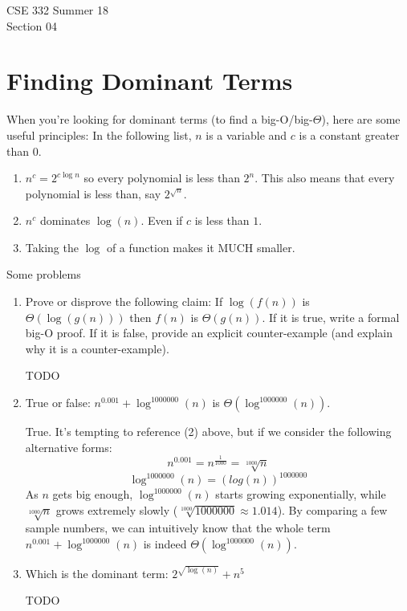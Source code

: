 \documentclass[12pt]{article}
\begin{document}
{\huge CSE 332 Summer 18\\
Section 04}
\section{Finding Dominant Terms}
When you're looking for dominant terms (to find a big-O/big-$\Theta$), here are some useful principles:
In the following list, $n$ is a variable and $c$ is a constant greater than $0$.
\begin{enumerate}
	\item $n^c = 2^{c \log n}$ so every polynomial is less than $2^n$. This also means that every polynomial is less than, say $2^{\sqrt{n}}$. 
	\item $n^c$ dominates $\log(n)$. Even if $c$ is less than $1$. 
	\item Taking the $\log$ of a function makes it MUCH smaller.
\end{enumerate}

Some problems
\begin{enumerate}
	\item Prove or disprove the following claim: If $\log( f(n) )$ is $\Theta(\log( g(n) ) )$ then $f(n)$ is $\Theta(g(n))$. If it is true, write a formal big-O proof. If it is false, provide an explicit counter-example (and explain why it is a counter-example). 
	\begin{tcolorbox}
	TODO
	\end{tcolorbox}
	
	\item True or false: $n^{0.001} + \log^{1000000}(n)$ is $\Theta\left( \log^{1000000}(n) \right)$.\\
	\begin{tcolorbox}
		True. It's tempting to reference (2) above, but if we consider the following alternative forms:
		$$n^{0.001}=n^{\frac{1}{1000}}=\sqrt[1000]{n}$$ 
		$$\log^{1000000}(n)=(log(n))^{1000000}$$
		As $n$ gets big enough, $\log^{1000000}(n)$ starts growing exponentially, while $\sqrt[1000]{n}$ grows extremely slowly ($\sqrt[1000]{1000000}\approx1.014$). By comparing a few sample numbers, we can intuitively know that the whole term $n^{0.001} + \log^{1000000}(n)$ is indeed $\Theta\left( \log^{1000000}(n) \right)$.
	\end{tcolorbox}

	\item Which is the dominant term: $2^{ \sqrt{\log(n)} } + n^{5}$ 

	\begin{tcolorbox}
	TODO
	\end{tcolorbox}
	
\end{enumerate}
\end{document}

